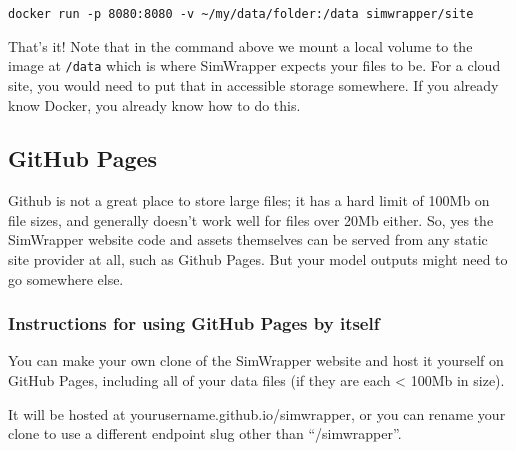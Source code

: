 \texttt{docker\ run\ -p\ 8080:8080\ -v\ \textasciitilde{}/my/data/folder:/data\ simwrapper/site}

That's it! Note that in the command above we mount a local volume to the
image at \texttt{/data} which is where SimWrapper expects your files to
be. For a cloud site, you would need to put that in accessible storage
somewhere. If you already know Docker, you already know how to do this.

\hypertarget{github-pages}{%
\subsection{GitHub Pages}\label{github-pages}}

Github is not a great place to store large files; it has a hard limit of
100Mb on file sizes, and generally doesn't work well for files over 20Mb
either. So, yes the SimWrapper website code and assets themselves can be
served from any static site provider at all, such as Github Pages. But
your model outputs might need to go somewhere else.

\hypertarget{instructions-for-using-github-pages-by-itself}{%
\subsubsection{Instructions for using GitHub Pages by
itself}\label{instructions-for-using-github-pages-by-itself}}

You can make your own clone of the SimWrapper website and host it
yourself on GitHub Pages, including all of your data files (if they are
each \textless{} 100Mb in size).

It will be hosted at yourusername.github.io/simwrapper, or you can
rename your clone to use a different endpoint slug other than
``/simwrapper''.


